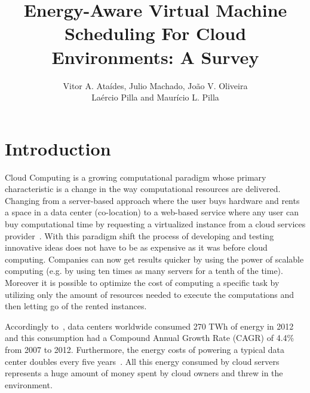 \documentclass{article}
\title{Energy-Aware Virtual Machine Scheduling For Cloud Environments: A Survey}
\author{Vitor A. Ataídes\inst{1}, Julio Machado\inst{1}, João V. Oliveira\inst{1} \\ Laércio Pilla\inst{2} and  Maurício L. Pilla\inst{1}}
\begin{document}
\maketitle

\begin{abstract}



\end{abstract}


\section{Introduction}

Cloud Computing is a growing computational paradigm whose primary characteristic is a change in the way computational resources are delivered. Changing from a server-based approach where the user buys hardware and rents a space in a data center (co-location) to a web-based service where any user can buy computational time by requesting a virtualized instance from a cloud services provider~\cite{NIST:2011}. With this paradigm shift the process of developing and testing innovative ideas does not have to be as expensive as it was before cloud computing. Companies can now get results quicker by using  the power of scalable computing (e.g. by using ten times as many servers for a tenth of the time). Moreover it is possible to optimize the cost of computing a specific task by utilizing only the amount of resources needed to execute the computations and then letting go of the rented instances.

Accordingly to~\cite{van2014trends}, data centers worldwide consumed 270 TWh of energy in 2012 and this consumption had a Compound Annual Growth Rate (CAGR) of 4.4\% from 2007 to 2012. Furthermore, the energy costs of powering a typical data center doubles every five years~\cite{buyya2013mastering}. All this energy consumed by cloud servers represents a huge amount  of money spent by cloud owners and  threw in the environment.
\end{document}
